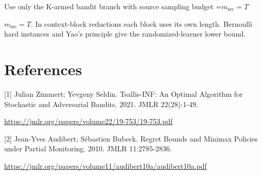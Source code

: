\documentclass[10pt,a4paper]{article}
\newcommand{\AtlasMath}[1]{\par\begingroup\centering\setbox0=\hbox{$\displaystyle #1$}\ifdim\wd0>1.4\linewidth\typeout{ATLAS WIDE FORMULA: \the\wd0}\fi\ifdim\wd0>\linewidth\resizebox{\linewidth}{!}{\box0}\else\box0\fi\par\endgroup}
\newcommand{\AtlasInlineMath}[1]{\begingroup\setbox0=\hbox{$#1$}\ifdim\wd0>.4\linewidth\endgroup\AtlasMath{#1}\else\endgroup$#1$\fi}
\begin{document}
Use only the K-armed bandit branch with source sampling budget \AtlasInlineMath{m_{\mathrm{src}}=T}. In context-block reductions each block uses its own length. Bernoulli hard instances and Yao's principle give the randomized-learner lower bound.

\section{References}
[1] Julian Zimmert; Yevgeny Seldin. Tsallis-INF: An Optimal Algorithm for Stochastic and Adversarial Bandits. 2021. JMLR 22(28):1-49.

\url{https://jmlr.org/papers/volume22/19-753/19-753.pdf}

[2] Jean-Yves Audibert; Sébastien Bubeck. Regret Bounds and Minimax Policies under Partial Monitoring. 2010. JMLR 11:2785-2836.

\url{https://jmlr.org/papers/volume11/audibert10a/audibert10a.pdf}
\end{document}
